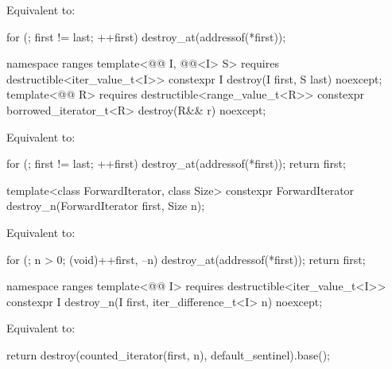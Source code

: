\begin{itemdescr}
\pnum
\effects
Equivalent to:
\begin{codeblock}
for (; first != last; ++first)
  destroy_at(addressof(*first));
\end{codeblock}
\end{itemdescr}

%
\begin{itemdecl}
namespace ranges {
  template<@@ I, @@<I> S>
      requires destructible<iter_value_t<I>>
    constexpr I destroy(I first, S last) noexcept;
  template<@@ R>
      requires destructible<range_value_t<R>>
    constexpr borrowed_iterator_t<R> destroy(R&& r) noexcept;
}
\end{itemdecl}

\begin{itemdescr}
\pnum
\effects
Equivalent to:
\begin{codeblock}
for (; first != last; ++first)
  destroy_at(addressof(*first));
return first;
\end{codeblock}
\end{itemdescr}

%
\begin{itemdecl}
template<class ForwardIterator, class Size>
  constexpr ForwardIterator destroy_n(ForwardIterator first, Size n);
\end{itemdecl}

\begin{itemdescr}
\pnum
\effects
Equivalent to:
\begin{codeblock}
for (; n > 0; (void)++first, --n)
  destroy_at(addressof(*first));
return first;
\end{codeblock}
\end{itemdescr}

%
\begin{itemdecl}
namespace ranges {
  template<@@ I>
      requires destructible<iter_value_t<I>>
    constexpr I destroy_n(I first, iter_difference_t<I> n) noexcept;
}
\end{itemdecl}

\begin{itemdescr}
\pnum
\effects
Equivalent to:
\begin{codeblock}
return destroy(counted_iterator(first, n), default_sentinel).base();
\end{codeblock}
\end{itemdescr}

